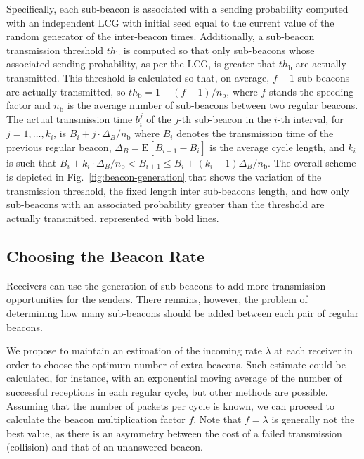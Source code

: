 \documentclass[journal,english,twocolumn,10pt,letterpaper]{IEEEtran}
\newcommand{\Esp}{\mathrm{E}}
\begin{document}
Specifically, each sub-beacon is associated with a sending probability
computed with an independent LCG with initial seed equal to the current value
of the random generator of the inter-beacon times. Additionally, a sub-beacon
transmission threshold $th_{\mathrm b}$ is computed so that only sub-beacons
whose associated sending probability, as per the LCG, is greater that
$th_{\mathrm b}$ are actually transmitted. This threshold is calculated so
that, on average, $f-1$ sub-beacons are actually transmitted, so
$th_{\mathrm b }=1-(f-1)/n_{\mathrm b}$, where $f$ stands the speeding factor and
$n_{\mathrm b}$ is the average number of sub-beacons between two regular
beacons. The actual transmission time $b_i^j$ of the $j$-th sub-beacon in the
$i$-th interval, for $j = 1, \dots, k_i$, is
$B_i + j \cdot \Delta_B /n_{\mathrm b}$ where $B_i$ denotes the transmission
time of the previous regular beacon, $\Delta_B = \Esp[B_{i + 1} - B_i]$ is the
average cycle length, and $k_i$ is such that
$B_i + k_i \cdot \Delta_B / n_{\mathrm b} < B_{i+1} \leq B_i + (k_i + 1)\Delta_B /
n_{\mathrm b}$.
The overall scheme is depicted in Fig.~\ref{fig:beacon-generation} that shows
the variation of the transmission threshold, the fixed length inter
sub-beacons length, and how only sub-beacons with an associated probability
greater than the threshold are actually transmitted, represented with bold
lines.

\subsection{Choosing the Beacon Rate}
\label{sec:choos-right-beac}

Receivers can use the generation of sub-beacons to add more transmission
opportunities for the senders. There remains, however, the problem of
determining how many sub-beacons should be added between each pair of regular
beacons.

We propose to maintain an estimation of the incoming rate $\lambda$ at each
receiver in order to choose the optimum number of extra beacons. Such estimate
could be calculated, for instance, with an exponential moving average of the
number of successful receptions in each regular cycle, but other methods are
possible. Assuming that the number of packets per cycle is known, we can
proceed to calculate the beacon multiplication factor $f$. Note that
$f = \lambda$ is generally not the best value, as there is an asymmetry
between the cost of a failed transmission (collision) and that of an
unanswered beacon.
\end{document}
